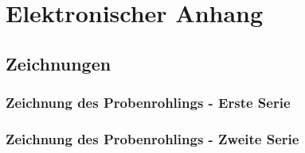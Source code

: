 \section{Elektronischer Anhang}

\subsection{Zeichnungen}
  \label{BLa}

  \subsubsection{Zeichnung des Probenrohlings - Erste Serie}

  \subsubsection{Zeichnung des Probenrohlings - Zweite Serie}

